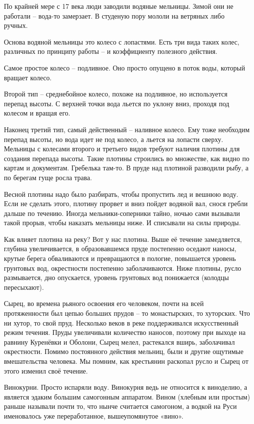 По крайней мере с 17 века люди заводили водяные мельницы. Зимой они не работали – вода-то замерзает. В студеную пору мололи на ветряных либо ручных.

Основа водяной мельницы это колесо с лопастями. Есть три вида таких колес, различных по принципу работы – и коэффициенту полезного действия. 

Самое простое колесо – подливное. Оно просто опущено в поток воды, который вращает колесо. 

Второй тип – среднебойное колесо, похоже на подливное, но используется перепад высоты. С верхней точки вода льется по уклону вниз, проходя под колесом и вращая его.

Наконец третий тип, самый действенный – наливное колесо. Ему тоже необходим перепад высоты, но вода идет не под колесо, а льется на лопасти сверху. Мельницы с колесами второго и третьего видов требуют наличия плотины для создания перепада высоты. Такие плотины строились во множестве, как видно по картам и документам. Гребелька там-то. В пруде над плотиной разводили рыбу, а по берегам гуще росла трава.

Весной плотины надо было разбирать, чтобы пропустить лед и вешнюю воду. Если не сделать этого, плотину прорвет и вниз пойдет водяной вал, снося гребли дальше по течению. Иногда мельники-соперники тайно, ночью сами вызывали такой прорыв, чтобы наказать мельницы ниже. И списывали на силы природы.

Как влияет плотина на реку? Вот у нас плотина. Выше её течение замедляется, глубина увеличивается, в образовавшемся пруде постепенно оседают наносы, крутые берега обваливаются и превращаются в пологие, повышается уровень грунтовых вод, окрестности постепенно заболачиваются. Ниже плотины, русло размывается, дно опускается, уровень грунтовых вод понижается (колодцы пересыхают).

Сырец, во времена рьяного освоения его человеком, почти на всей протяженности был цепью больших прудов – то монастырских, то хуторских. Что ни хутор, то свой пруд. Несколько веков в реке поддерживался искусственный режим течения. Пруды увеличивали количество наносов, поэтому при выходе на равнину Куренёвки и Оболони, Сырец мелел, растекался вширь, заболачивал окрестности. Помимо постоянного действия мельниц, были и другие ощутимые вмешательства человека. Мы помним, как крестьянин раскопал русло и Сырец от этого изменил своё течение.

Винокурни. Просто испаряли воду. Винокурня ведь не относится к виноделию, а является эдаким большим самогонным аппаратом. Вином (хлебным или простым) раньше называли почти то, что нынче считается самогоном, а водкой на Руси именовалось уже переработанное, вышеупомянутое «вино».

